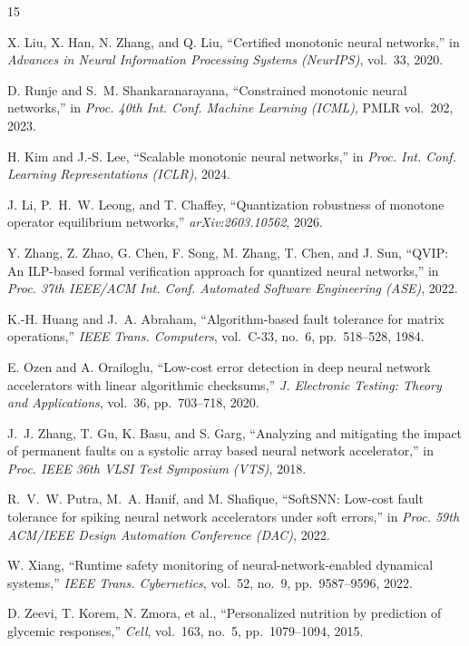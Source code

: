 \documentclass[conference]{IEEEtran}
\begin{document}
\begin{thebibliography}{15}

X. Liu, X. Han, N. Zhang, and Q. Liu, ``Certified monotonic neural networks,''
in \emph{Advances in Neural Information Processing Systems (NeurIPS)}, vol.~33,
2020.

D. Runje and S.~M. Shankaranarayana, ``Constrained monotonic neural networks,''
in \emph{Proc. 40th Int. Conf. Machine Learning (ICML)}, PMLR vol.~202, 2023.

H. Kim and J.-S. Lee, ``Scalable monotonic neural networks,'' in \emph{Proc.
Int. Conf. Learning Representations (ICLR)}, 2024.

J. Li, P.~H.~W. Leong, and T. Chaffey, ``Quantization robustness of monotone
operator equilibrium networks,'' \emph{arXiv:2603.10562}, 2026.

Y. Zhang, Z. Zhao, G. Chen, F. Song, M. Zhang, T. Chen, and J. Sun, ``QVIP: An
ILP-based formal verification approach for quantized neural networks,'' in
\emph{Proc. 37th IEEE/ACM Int. Conf. Automated Software Engineering (ASE)},
2022.

K.-H. Huang and J.~A. Abraham, ``Algorithm-based fault tolerance for matrix
operations,'' \emph{IEEE Trans. Computers}, vol.~C-33, no.~6, pp.~518--528,
1984.

E. Ozen and A. Orailoglu, ``Low-cost error detection in deep neural network
accelerators with linear algorithmic checksums,'' \emph{J. Electronic Testing:
Theory and Applications}, vol.~36, pp.~703--718, 2020.

J.~J. Zhang, T. Gu, K. Basu, and S. Garg, ``Analyzing and mitigating the impact
of permanent faults on a systolic array based neural network accelerator,'' in
\emph{Proc. IEEE 36th VLSI Test Symposium (VTS)}, 2018.

R.~V.~W. Putra, M.~A. Hanif, and M. Shafique, ``SoftSNN: Low-cost fault
tolerance for spiking neural network accelerators under soft errors,'' in
\emph{Proc. 59th ACM/IEEE Design Automation Conference (DAC)}, 2022.

W. Xiang, ``Runtime safety monitoring of neural-network-enabled dynamical
systems,'' \emph{IEEE Trans. Cybernetics}, vol.~52, no.~9, pp.~9587--9596,
2022.

D. Zeevi, T. Korem, N. Zmora, et al., ``Personalized nutrition by prediction of
glycemic responses,'' \emph{Cell}, vol.~163, no.~5, pp.~1079--1094, 2015.


\end{thebibliography}
\end{document}
